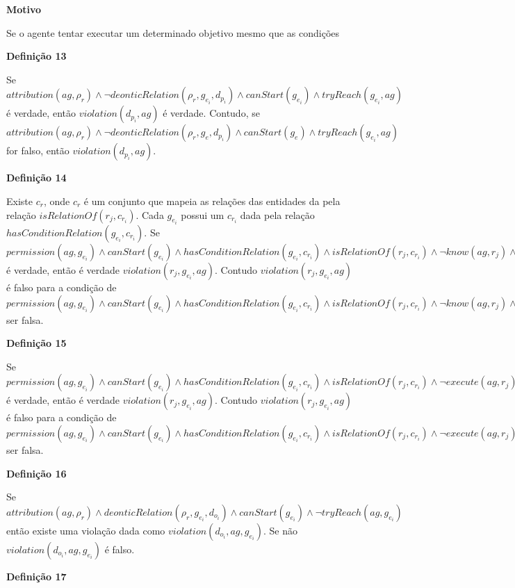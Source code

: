 \documentclass[12pt]{article}
\begin{document}
\textbf{Motivo} 

Se o agente tentar executar um determinado objetivo mesmo que as condições    

\textbf{Definição 13}

Se $ attribution(ag,\rho_{r}) \wedge \neg deonticRelation(\rho_{r},g_{e_i},d_{p_i}) \wedge canStart(g_{e_i}) \wedge tryReach(g_{e_i},ag) $ é verdade, então $ violation(d_{p_i},ag) $ é verdade. Contudo, se $ attribution(ag,\rho_{r}) \wedge \neg deonticRelation(\rho_{r},g_{e},d_{p_i}) \wedge canStart(g_e) \wedge tryReach(g_{e_i},ag) $ for falso, então $ violation(d_{p_i},ag) $.

\textbf{Definição 14} 

Existe $c_r$, onde $c_r$ é um conjunto que mapeia as relações das entidades da pela relação $isRelationOf(r_j,c_{r_i})$. Cada $g_{e_i}$ possui um $c_{r_i}$ dada pela relação $hasConditionRelation(g_{e_i},c_{r_i})$. Se $ permission(ag,g_{e_i}) \wedge canStart(g_{e_i}) \wedge hasConditionRelation(g_{e_i},c_{r_i}) \wedge isRelationOf(r_j,c_{r_i}) \wedge \neg know(ag,r_j) \wedge tryReach(ag,g_{e_i})$ é verdade, então é verdade $ violation(r_j,g_{e_i},ag) $. Contudo $ violation(r_j,g_{e_i},ag) $ é falso para a condição de $ permission(ag,g_{e_i}) \wedge canStart(g_{e_i}) \wedge hasConditionRelation(g_{e_i},c_{r_i}) \wedge isRelationOf(r_j,c_{r_i}) \wedge \neg know(ag,r_j) \wedge tryReach(ag,g_{e_i})$ ser falsa.

\textbf{Definição 15}

Se $ permission(ag,g_{e_i}) \wedge canStart(g_{e_i}) \wedge hasConditionRelation(g_{e_i},c_{r_i}) \wedge isRelationOf(r_j,c_{r_i}) \wedge \neg execute(ag,r_j) \wedge tryReach(ag,g_{e_i})$ é verdade, então é verdade $ violation(r_j,g_{e_i},ag) $. Contudo $ violation(r_j,g_{e_i},ag) $ é falso para a condição de $ permission(ag,g_{e_i}) \wedge canStart(g_{e_i}) \wedge hasConditionRelation(g_{e_i},c_{r_i}) \wedge isRelationOf(r_j,c_{r_i}) \wedge \neg execute(ag,r_j) \wedge tryReach(ag,g_{e_i})$ ser falsa.

\textbf{Definição 16}

Se $ attribution(ag,\rho_{r}) \wedge deonticRelation(\rho_{r},g_{e_i},d_{o_i}) \wedge canStart(g_{e_i}) \wedge \neg tryReach(ag,g_{e_i}) $ então existe uma violação dada como $ violation(d_{o_i},ag,g_{e_i}) $. Se não $ violation(d_{o_i},ag,g_{e_i}) $ é falso.

\textbf{Definição 17} 
\end{document}
